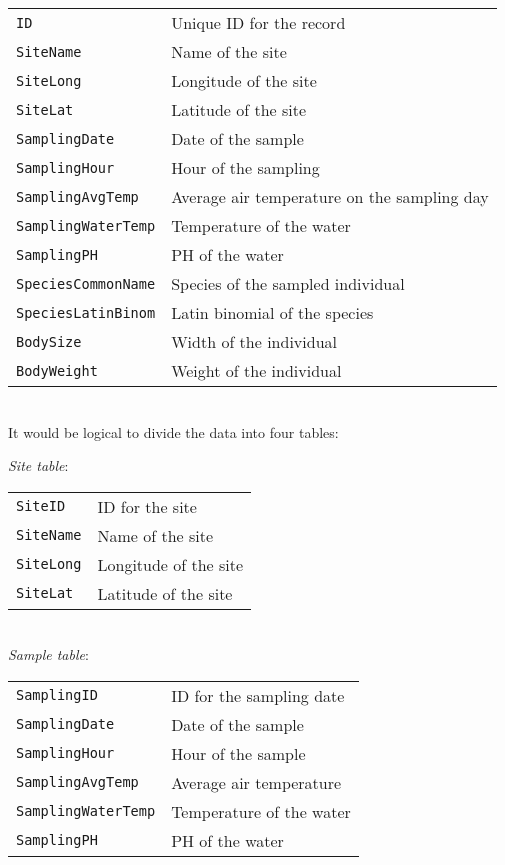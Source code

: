 \begin{tabular}{p{4cm} p{8cm}}
		{\tt ID} & Unique ID for the record\\
		{\tt SiteName} & Name of the site\\
	  {\tt SiteLong} & Longitude of the site\\
	  {\tt SiteLat} & Latitude of the site\\
	  {\tt SamplingDate} & Date of the sample\\
	  {\tt SamplingHour} & Hour of the sampling\\
	  {\tt SamplingAvgTemp} & Average air temperature on the sampling day\\
	  {\tt SamplingWaterTemp} & Temperature of the water\\
	  {\tt SamplingPH} & PH of the water\\
	  {\tt SpeciesCommonName} & Species of the sampled individual\\
	  {\tt SpeciesLatinBinom} & Latin binomial of the species\\
	  {\tt BodySize} & Width of the individual\\
	  {\tt BodyWeight} & Weight of the individual\\
\end{tabular}\\
  
It would be logical to divide the data into four tables:

{\it Site table}:\\
	\begin{tabular}{p{3cm} p{6cm}}
		{\tt SiteID} & ID for the site\\
		{\tt SiteName} & Name of the site\\
		{\tt SiteLong} & Longitude of the site\\
		{\tt SiteLat} & Latitude of the site\\
	\end{tabular}\\

{\it Sample table}:\\
	\begin{tabular}{p{4cm} p{6cm}}
		{\tt SamplingID} & ID for the sampling date\\
		{\tt SamplingDate} & Date of the sample\\
		{\tt SamplingHour} & Hour of the sample\\
		{\tt SamplingAvgTemp} & Average air temperature\\
		{\tt SamplingWaterTemp} & Temperature of the water\\
		{\tt SamplingPH} & PH of the water\\
	\end{tabular}\\
    

